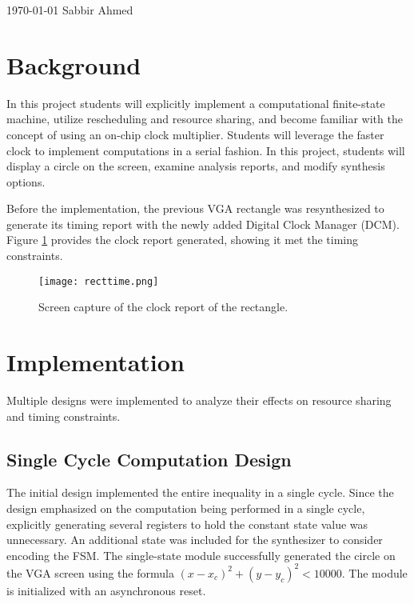 \documentclass[paper=usletter, fontsize=12pt]{article}
\begin{document}
    {\today} {Sabbir Ahmed}
    \vspace{-0.1in}

    \section{Background} In this project students will explicitly implement a
    computational finite-state machine, utilize rescheduling and resource
    sharing, and become familiar with the concept of using an on-chip clock
    multiplier. Students will leverage the faster clock to implement
    computations in a serial fashion. In this project, students will display a
    circle on the screen, examine analysis reports, and modify synthesis
    options.

    Before the implementation, the previous VGA rectangle was resynthesized to
    generate its timing report with the newly added Digital Clock Manager
    (DCM). Figure \ref{fig:recttime} provides the clock report generated,
    showing it met the timing constraints.
    \begin{figure}[ht]
        \begin{center}
            \texttt{[image: recttime.png]}
            \caption{Screen capture of the clock report of the rectangle.}
            \label{fig:recttime}
        \end{center}
    \end{figure}

    \section{Implementation} Multiple designs were implemented to analyze their
    effects on resource sharing and timing constraints.

        \subsection{Single Cycle Computation Design} The initial design
        implemented the entire inequality in a single cycle. Since the design
        emphasized on the computation being performed in a single cycle,
        explicitly generating several registers to hold the constant state
        value was unnecessary. An additional state was included for the
        synthesizer to consider encoding the FSM. The single-state module
        successfully generated the circle on the VGA screen using the formula
        $(x - x_c)^2 + (y - y_c)^2 < 10000$. The module is initialized with an
        asynchronous reset.
\end{document}
